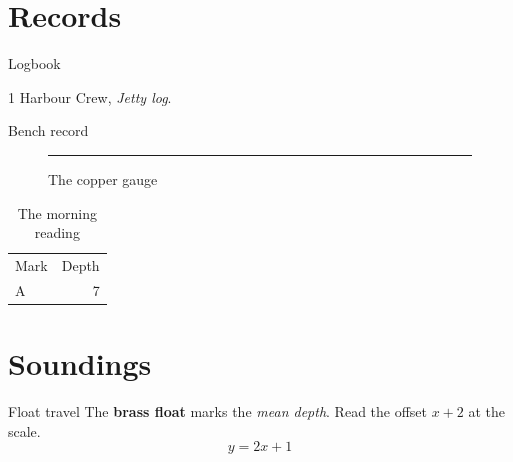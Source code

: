 \documentclass{beamer}
\begin{document}
\section{Records}
\begin{frame}\sectionpage\end{frame}
\begin{frame}{Logbook}
\begin{thebibliography}{1}
 Harbour Crew, \emph{Jetty log}.
\end{thebibliography}
\end{frame}
\begin{frame}{Bench record}
\begin{figure}
\rule{12mm}{2mm}
\caption{The copper gauge}
\end{figure}
\begin{table}
\begin{tabular}{lr}
Mark & Depth\\
A & 7
\end{tabular}
\caption{The morning reading}
\end{table}
\end{frame}
\section{Soundings}
\begin{frame}{Float travel}
The \textbf{brass float} marks the \textit{mean depth}.
Read the offset $x+2$ at the scale.
\[
  y=2x+1
\]
\end{frame}
\end{document}
